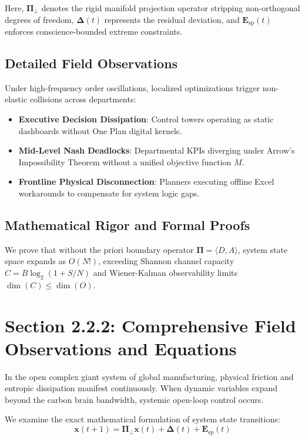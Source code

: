\documentclass[12pt,a4paper,oneside]{book}
\begin{document}
Here, $\mathbf{\Pi}_{\bot}$ denotes the rigid manifold projection operator stripping non-orthogonal degrees of freedom, $\mathbf{\Delta}(t)$ represents the residual deviation, and $\mathbf{E}_{\mathrm{sp}}(t)$ enforces conscience-bounded extreme constraints.

\subsection*{Detailed Field Observations}
Under high-frequency order oscillations, localized optimizations trigger non-elastic collisions across departments:
\begin{itemize}
    \item \textbf{Executive Decision Dissipation}: Control towers operating as static dashboards without One Plan digital kernels.
    \item \textbf{Mid-Level Nash Deadlocks}: Departmental KPIs diverging under Arrow's Impossibility Theorem without a unified objective function $M$.
    \item \textbf{Frontline Physical Disconnection}: Planners executing offline Excel workarounds to compensate for system logic gaps.
\end{itemize}

\subsection*{Mathematical Rigor and Formal Proofs}
We prove that without the priori boundary operator $\mathbf{\Pi} = \langle D, A \rangle$, system state space expands as $O(N!)$, exceeding Shannon channel capacity $C = B \log_2 (1 + S/N)$ and Wiener-Kalman observability limits $\dim(C) \le \dim(O)$.
\clearpage
\section{Section 2.2.2: Comprehensive Field Observations and Equations}

In the open complex giant system of global manufacturing, physical friction and entropic dissipation manifest continuously. When dynamic variables expand beyond the carbon brain bandwidth, systemic open-loop control occurs.

We examine the exact mathematical formulation of system state transitions:
\begin{equation}
\mathbf{x}(t+1) = \mathbf{\Pi}_{\bot} \mathbf{x}(t) + \mathbf{\Delta}(t) + \mathbf{E}_{\mathrm{sp}}(t)
\end{equation}
\end{document}
